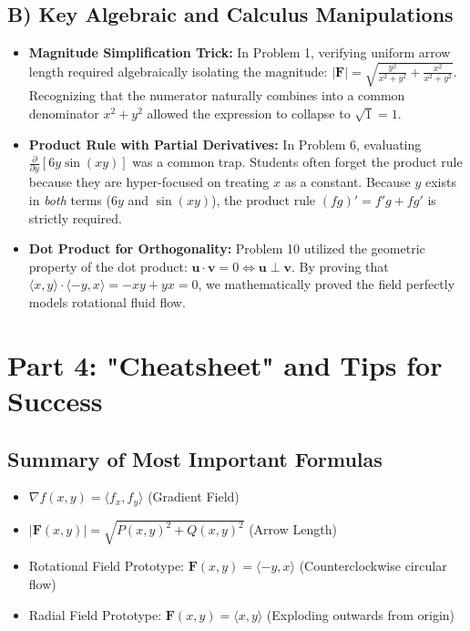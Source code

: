 \documentclass[11pt]{article}
\begin{document}
\subsection{B) Key Algebraic and Calculus Manipulations}
\begin{itemize}
    \item \textbf{Magnitude Simplification Trick:} In Problem 1, verifying uniform arrow length required algebraically isolating the magnitude: $|\mathbf{F}| = \sqrt{\frac{y^2}{x^2+y^2} + \frac{x^2}{x^2+y^2}}$. Recognizing that the numerator naturally combines into a common denominator $x^2+y^2$ allowed the expression to collapse to $\sqrt{1} = 1$.
    \item \textbf{Product Rule with Partial Derivatives:} In Problem 6, evaluating $\frac{\partial}{\partial y} [6y \sin(xy)]$ was a common trap. Students often forget the product rule because they are hyper-focused on treating $x$ as a constant. Because $y$ exists in \textit{both} terms ($6y$ and $\sin(xy)$), the product rule $(fg)' = f'g + fg'$ is strictly required.
    \item \textbf{Dot Product for Orthogonality:} Problem 10 utilized the geometric property of the dot product: $\mathbf{u} \cdot \mathbf{v} = 0 \iff \mathbf{u} \perp \mathbf{v}$. By proving that $\langle x,y \rangle \cdot \langle -y, x \rangle = -xy + yx = 0$, we mathematically proved the field perfectly models rotational fluid flow.
\end{itemize}

\section{Part 4: "Cheatsheet" and Tips for Success}

\subsection{Summary of Most Important Formulas}
\begin{itemize}
    \item $\nabla f(x, y) = \langle f_x, f_y \rangle$ \quad (Gradient Field)
    \item $|\mathbf{F}(x,y)| = \sqrt{P(x,y)^2 + Q(x,y)^2}$ \quad (Arrow Length)
    \item Rotational Field Prototype: $\mathbf{F}(x,y) = \langle -y, x \rangle$ (Counterclockwise circular flow)
    \item Radial Field Prototype: $\mathbf{F}(x,y) = \langle x, y \rangle$ (Exploding outwards from origin)
\end{itemize}
\end{document}
